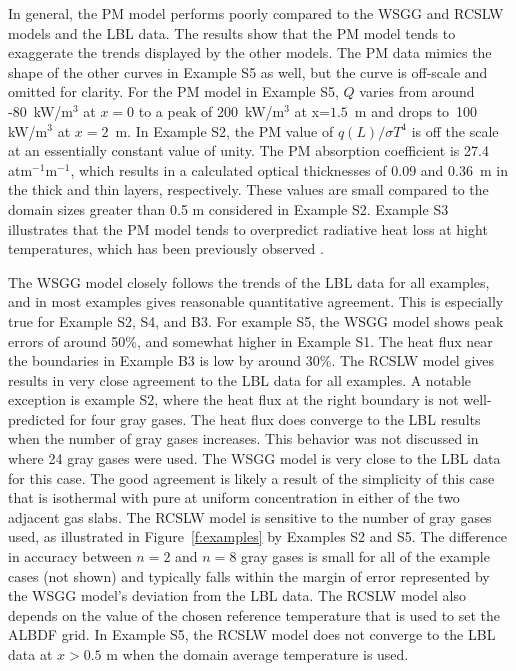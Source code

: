 \documentclass[preprint,12pt]{elsarticle}
\begin{document}
In general, the PM model performs poorly compared to the WSGG and RCSLW models and the LBL data. The results show that the PM model tends to exaggerate the trends displayed by the other models. The PM data mimics the shape of the other curves in Example S5 as well, but the curve is off-scale and omitted for clarity. For the PM model in Example S5, $Q$ varies from around -80~kW/m$^3$ at $x=0$ to a peak of 200~kW/m$^3$ at x=$1.5$~m and drops to~100 kW/m$^3$ at $x=2$~m. 
In Example S2, the PM value of $q(L)/\sigma T^4$ is off the scale at an essentially constant value of unity. The PM absorption coefficient is 27.4 atm$^{-1}$m$^{-1}$, which results in a calculated optical thicknesses of 0.09 and 0.36~m in the thick and thin layers, respectively. These values are small compared to the domain sizes greater than 0.5 m considered in Example S2.
Example S3 illustrates that the PM model tends to overpredict radiative heat loss at hight temperatures, which has been previously observed \cite{Frank_2000,Zhu_2002,Coelho_2002}. 

The WSGG model closely follows the trends of the LBL data for all examples, and in most examples gives reasonable quantitative agreement. This is especially true for Example S2, S4, and B3. For example S5, the WSGG model shows peak errors of around 50\%, and somewhat higher in Example S1. The heat flux near the boundaries in Example B3 is low by around 30\%. The RCSLW model gives results in very close agreement to the LBL data for all examples. A notable exception is example S2, where the heat flux at the right boundary is not well-predicted for four gray gases. The heat flux does converge to the LBL results when the number of gray gases increases. This behavior was not discussed in \cite{Solovjov_2017} where 24 gray gases were used. The WSGG model is very close to the LBL data for this case. The good agreement is likely a result of the simplicity of this case that is isothermal with pure  at uniform concentration in either of the two adjacent gas slabs.
The RCSLW model is sensitive to the number of gray gases used, as illustrated in Figure~\ref{f:examples} by Examples S2 and S5. The difference in accuracy between $n=2$ and $n=8$ gray gases is small for all of the example cases (not shown) and typically falls within the margin of error represented by the WSGG model's deviation from the LBL data. 
The RCSLW model also depends on the value of the chosen reference temperature that is used to set the ALBDF grid. In Example S5, the RCSLW model does not converge to the LBL data at $x>0.5$ m when the domain average temperature is used.
\end{document}
